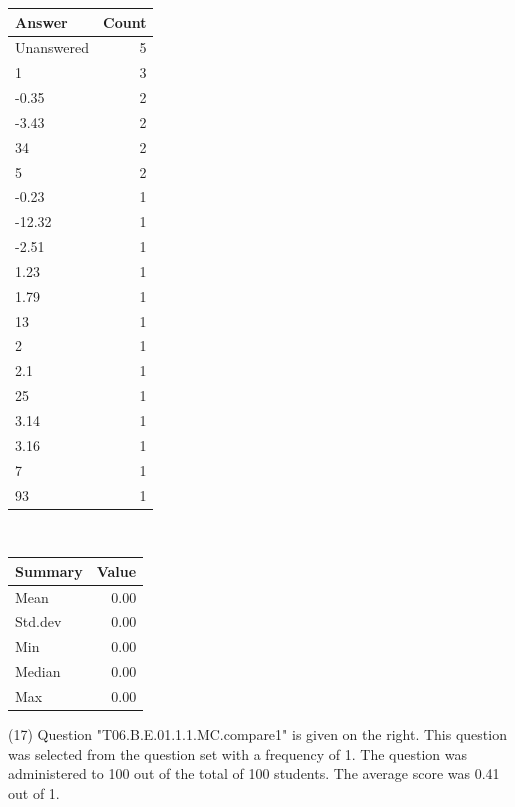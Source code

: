 \documentclass[12pt,nohyper]{tufte-handout}\usepackage[]{graphicx}\usepackage[]{color}
\begin{document}
\begin{center}%
\begin{tabular}{lr}
  \hline
Answer & Count \\ 
  \hline
Unanswered &   5 \\ 
  1 &   3 \\ 
  -0.35 &   2 \\ 
  -3.43 &   2 \\ 
  34 &   2 \\ 
  5 &   2 \\ 
  -0.23 &   1 \\ 
  -12.32 &   1 \\ 
  -2.51 &   1 \\ 
  1.23 &   1 \\ 
  1.79 &   1 \\ 
  13 &   1 \\ 
  2 &   1 \\ 
  2.1 &   1 \\ 
  25 &   1 \\ 
  3.14 &   1 \\ 
  3.16 &   1 \\ 
  7 &   1 \\ 
  93 &   1 \\ 
   \hline
\end{tabular}
~~~~~~~~%
\begin{tabular}{lr}
  \hline
Summary & Value \\ 
  \hline
Mean & 0.00 \\ 
  Std.dev & 0.00 \\ 
  Min & 0.00 \\ 
  Median & 0.00 \\ 
  Max & 0.00 \\ 
   \hline
\end{tabular}
\end{center}\newpage{} (17) Question "T06.B.E.01.1.1.MC.compare1" is given on the right. This question was selected from the question set with a frequency of 1. The question was administered to 100 out of the total of 100 students. The average score was 0.41 out of 1.
\end{document}
